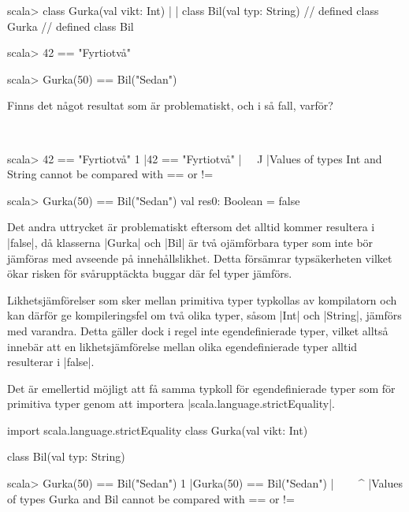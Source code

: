 \begin{REPL}
scala> class Gurka(val vikt: Int)
     |
     | class Bil(val typ: String)
// defined class Gurka
// defined class Bil

scala> 42 == "Fyrtiotvå"

scala> Gurka(50) == Bil("Sedan")

\end{REPL}

Finns det något resultat som är problematiskt, och i så fall, varför?


\SOLUTION

\TaskSolved \what~
\begin{REPL}
scala> 42 == "Fyrtiotvå"
1 |42 == "Fyrtiotvå"
  |^^^^^^^^^^^^^^^^^
  |Values of types Int and String cannot be compared with == or !=

scala> Gurka(50) == Bil("Sedan")
val res0: Boolean = false
\end{REPL}

Det andra uttrycket är problematiskt eftersom det alltid kommer resultera i \code|false|, då klasserna \code|Gurka| och \code|Bil| är två ojämförbara typer som inte bör jämföras med avseende på innehållslikhet. Detta försämrar typsäkerheten vilket ökar risken för svårupptäckta buggar där fel typer jämförs.

Likhetsjämförelser som sker mellan primitiva typer typkollas av kompilatorn och kan därför ge kompileringsfel om två olika typer, såsom \code|Int| och \code|String|, jämförs med varandra. Detta gäller dock i regel inte egendefinierade typer, vilket alltså innebär att en likhetsjämförelse mellan olika egendefinierade typer alltid resulterar i \code|false|.

Det är emellertid möjligt att få samma typkoll för egendefinierade typer som för primitiva typer genom att importera \code|scala.language.strictEquality|.

\begin{Code}
import scala.language.strictEquality
class Gurka(val vikt: Int)

class Bil(val typ: String)
\end{Code}

\begin{REPL}
scala> Gurka(50) == Bil("Sedan")
1 |Gurka(50) == Bil("Sedan")
  |^^^^^^^^^^^^^^^^^^^^^^^^^
  |Values of types Gurka and Bil cannot be compared with == or !=
\end{REPL}

\QUESTEND



